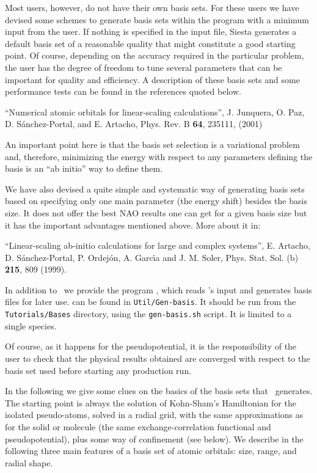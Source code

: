 Most users, however, do not have their own basis sets. For these users
we have devised some schemes to generate basis sets within the program
with a minimum input from the user.  If nothing is specified in the
input file, Siesta generates a default basis set of a reasonable
quality that might constitute a good starting point.  Of course,
depending on the accuracy required in the particular problem, the user
has the degree of freedom to tune several parameters that can be
important for quality and efficiency. A description of these basis
sets and some performance tests can be found in the references quoted
below.

\noindent
``Numerical atomic orbitals for linear-scaling calculations'',
J. Junquera, O. Paz, D. S\'anchez-Portal, and E. Artacho, Phys. Rev. B
\textbf{64}, 235111, (2001)

An important point here is that the basis set selection is a
variational problem and, therefore, minimizing the energy with respect
to any parameters defining the basis is an ``ab initio'' way to
define them.

We have also devised a quite simple and systematic way of generating
basis sets based on specifying only one main parameter (the energy shift)
besides the basis size. It does not offer the best NAO results one can get
for a given basis size but it has the important advantages mentioned above.
More about it in:

\noindent
``Linear-scaling ab-initio calculations for large and complex systems'',
E. Artacho, D. S\'anchez-Portal, P. Ordej\'on, A. Garc\'{\i}a and
J. M. Soler, Phys. Stat. Sol. (b) \textbf{215}, 809 (1999).

In addition to \siesta\ we provide the program 
, which reads \siesta's input and
generates basis files for later use.  can be found
in \texttt{Util/Gen-basis}. 
It should be run from the \texttt{Tutorials/Bases} directory,
using the \texttt{gen-basis.sh} script. It is limited to a single species.

Of course, as it happens for the pseudopotential, it is the
responsibility of the user to check that the physical results obtained
are converged with respect to the basis set used before starting any
production run.

In the following we give some clues on the basics of the basis sets
that \siesta\ generates.
  The starting point is always the solution of Kohn-Sham's Hamiltonian
for the isolated pseudo-atoms, solved in a radial grid,
with the same approximations as for the solid or molecule
(the same exchange-correlation functional and  pseudopotential),
plus some way of confinement (see below).
  We describe in the following three main features of a
basis set of atomic orbitals: size, range, and radial shape.

